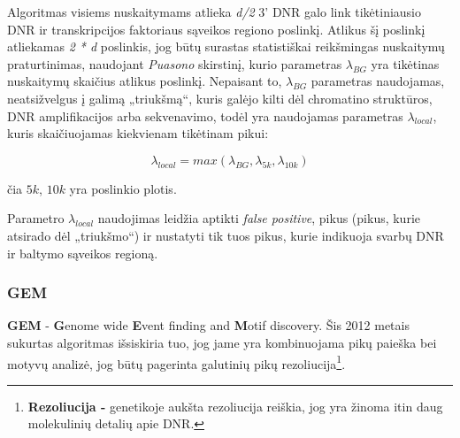 \documentclass[12pt]{article}
\begin{document}
Algoritmas visiems nuskaitymams atlieka \emph{d/2} 3' DNR galo link
tikėtiniausio DNR ir transk\-rip\-ci\-jos faktoriaus sąveikos regiono poslinkį.
Atlikus šį poslinkį atliekamas \emph{2 * d} poslinkis, jog būtų surastas
statistiškai reikšmingas nuskaitymų praturtinimas, naudojant \emph{Puasono}
skirstinį, kurio parametras \(\lambda_{BG}\) yra tikėtinas nuskaitymų skaičius
atlikus poslinkį. Nepaisant to, \(\lambda_{BG}\) parametras naudojamas,
neatsižvelgus į galimą „triukšmą“, kuris galėjo kilti dėl chromatino struktūros,
DNR amplifikacijos arba sekvenavimo, todėl yra naudojamas parametras
\(\lambda_{local}\), kuris skaičiuojamas kiekvienam tikėtinam
pikui:

\begin{equation} \label{lambda_local}
    \lambda_{local} = max(\lambda_{BG}, \lambda_{5k}, \lambda_{10k})
\end{equation}

čia \(5k\), \(10k\) yra poslinkio plotis.

Parametro \(\lambda_{local}\) naudojimas leidžia aptikti \emph{false positive},
pikus (pikus, kurie atsirado dėl „triukšmo“) ir nustatyti tik tuos pikus,
kurie indikuoja svarbų DNR ir baltymo sąveikos regioną\cite{ARTICLE12}.
  
\subsubsection{GEM}
\textbf{GEM} - \textbf{G}enome wide \textbf{E}vent finding and \textbf{M}otif
discovery. Šis 2012 metais sukurtas algoritmas išsiskiria tuo, jog jame yra
kombinuojama pikų paieška bei motyvų analizė, jog būtų pagerinta galutinių pikų
rezoliucija\footnote{\textbf{Rezoliucija - } genetikoje aukšta rezoliucija
reiškia, jog yra žinoma itin daug molekulinių detalių apie DNR.}.\\
\end{document}

